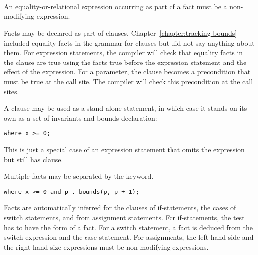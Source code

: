 \begin{tabbing}
\=\\
\> \\
\> \\
\>
\end{tabbing}

\begin{tabbing}
\=\\
\> \\
\> \\
\> \\
\> \\
\end{tabbing}

An equality-or-relational expression occurring as part of a fact must be a
non-modifying expression.

Facts may be declared as part of  clauses.  
Chapter~\ref{chapter:tracking-bounds} included equality facts in
the grammar for  clauses but did not say
anything about them.  For expression statements, the compiler
will check that equality facts in the  clause are true
using the facts true before the expression statement and the effect of
the expression. For a parameter, the  clause becomes a 
precondition that must be true at the call site. The compiler will check this
precondition at the call sites.

A  clause may be used as a stand-alone statement, 
in which case it stands on its own as a set of invariants and bounds
declaration:
\begin{lstlisting}
where x >= 0;
\end{lstlisting}
This is just a special case of an expression statement
that omits the expression but still has  clause.

Multiple facts may be separated by the  keyword.
\begin{lstlisting}
where x >= 0 and p : bounds(p, p + 1);
\end{lstlisting}

Facts are automatically inferred for the clauses of if-statements, the cases of
switch statements, and from assignment statements.  For if-statements, the test
has to have the form of a fact. For a switch statement, a fact is deduced from
the switch expression and the case statement. For assignments, the left-hand
side and the right-hand size expressions must be non-modifying expressions.

